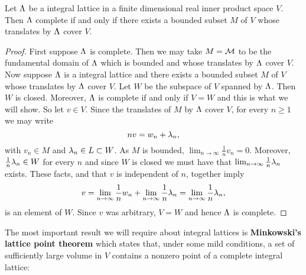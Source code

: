     \begin{proposition}\label{prop:complete_integral lattice_if_and_only_if_bounded_translates_cover}
      Let $\Lambda$ be a integral lattice in a finite dimensional real inner product space $V$. Then $\Lambda$ complete if and only if there exists a bounded subset $M$ of $V$ whose translates by $\Lambda$ cover $V$.
    \end{proposition}
    \begin{proof}
      First suppose $\Lambda$ is complete. Then we may take $M = \mathcal{M}$ to be the fundamental domain of $\Lambda$ which is bounded and whose translates by $\Lambda$ cover $V$. Now suppose $\Lambda$ is a integral lattice and there exists a bounded subset $M$ of $V$ whose translates by $\Lambda$ cover $V$. Let $W$ be the subspace of $V$ spanned by $\Lambda$. Then $W$ is closed. Moreover, $\Lambda$ is complete if and only if $V = W$ and this is what we will show. So let $v \in V$. Since the translates of $M$ by $\Lambda$ cover $V$, for every $n \ge 1$ we may write
      \[
        nv = w_{n}+\lambda_{n},
      \]
      with $v_{n} \in M$ and $\lambda_{n} \in L \subset W$. As $M$ is bounded, $\lim_{n \to \infty}\frac{1}{n}v_{n} = 0$. Moreover, $\frac{1}{n}\lambda_{n} \in W$ for every $n$ and since $W$ is closed we must have that $\lim_{n \to \infty}\frac{1}{n}\lambda_{n}$ exists. These facts, and that $v$ is independent of $n$, together imply
      \[
        v = \lim_{n \to \infty}\frac{1}{n}w_{n}+\lim_{n \to \infty}\frac{1}{n}\lambda_{n} = \lim_{n \to \infty}\frac{1}{n}\lambda_{n},
      \]
      is an element of $W$. Since $v$ was arbitrary, $V = W$ and hence $\Lambda$ is complete.
    \end{proof}

    The most important result we will require about integral lattices is \textbf{Minkowski's lattice point theorem} which states that, under some mild conditions, a set of sufficiently large volume in $V$ contains a nonzero point of a complete integral lattice:

